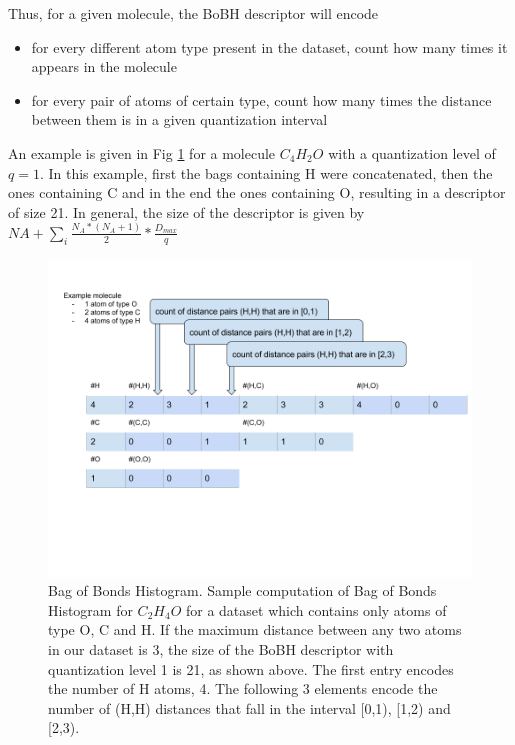 \documentclass{article}
\begin{document}
Thus, for a given molecule, the BoBH descriptor will encode
\begin{itemize}
\item 
for every different atom type present in the dataset, count how many times it appears in the molecule
\item  
for every pair of atoms of certain type, count how many times the distance between them is in a given quantization interval 
\end{itemize}

An example is given in Fig \ref{fig:BoBH} for a molecule $C_{4}H_{2}O$ with a quantization level of $q=1$. In this example, first the bags containing H were concatenated, then the ones containing C and in the end the ones containing O, resulting in a descriptor of size 21. In general, the size of the descriptor is given by $NA + \sum_i \frac{N_A*(N_A+1)}{2} *\frac{D_{max}}{q} $ 

\begin{figure}[h!]

\includegraphics[scale=0.4]{HistogramOfDistances.png}
\caption{Bag of Bonds Histogram.
Sample computation of Bag of Bonds Histogram for $C_2H_4O$ for a dataset which contains only atoms of type O, C and H. If the maximum distance between any two atoms in our dataset is 3, the size of the BoBH descriptor with quantization level  1 is 21, as shown above. The first entry encodes the number of H atoms, 4. The following 3 elements encode the number of (H,H) distances that fall in the interval [0,1), [1,2) and [2,3).
}
\label{fig:BoBH}
\end{figure}
\end{document}
